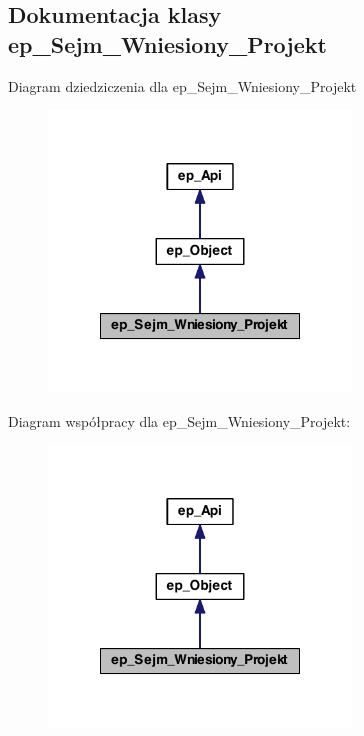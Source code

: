 \hypertarget{classep___sejm___wniesiony___projekt}{\subsection{Dokumentacja klasy ep\-\_\-\-Sejm\-\_\-\-Wniesiony\-\_\-\-Projekt}
\label{classep___sejm___wniesiony___projekt}
}


Diagram dziedziczenia dla ep\-\_\-\-Sejm\-\_\-\-Wniesiony\-\_\-\-Projekt\nopagebreak
\begin{figure}[H]
\begin{center}
\leavevmode
\includegraphics[width=228pt]{classep___sejm___wniesiony___projekt__inherit__graph}
\end{center}
\end{figure}


Diagram współpracy dla ep\-\_\-\-Sejm\-\_\-\-Wniesiony\-\_\-\-Projekt\-:\nopagebreak
\begin{figure}[H]
\begin{center}
\leavevmode
\includegraphics[width=228pt]{classep___sejm___wniesiony___projekt__coll__graph}
\end{center}
\end{figure}

